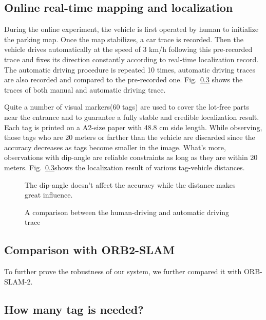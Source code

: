 \documentclass[journal]{IEEEtran}
\newcommand{\Reffig}[1]{Fig.~\ref{#1}}
\begin{document}
\subsection{Online real-time mapping and localization}
During the online experiment, the vehicle is first operated by human to initialize the parking map. 
Once the map stabilizes, a car trace is recorded.
Then the vehicle drives automatically at the speed of 3 km/h following this pre-recorded trace and fixes its direction constantly according to real-time localization record.
The automatic driving procedure is repeated 10 times, automatic driving traces are also recorded and compared to the pre-recorded one.
\Reffig{} shows the traces of both manual and automatic driving trace.

Quite a number of visual markers(60 tags) are used to cover the lot-free parts near the entrance and to guarantee a fully stable and credible localization result.
Each tag is printed on a A2-size paper with 48.8 cm side length.
While observing, those tags who are 20 meters or farther than the vehicle are discarded since the accuracy decreases as tags become smaller in the image.
What's more, observations with dip-angle are reliable constraints as long as they are within 20 meters.
\Reffig{}shows the localization result of various tag-vehicle distances.

\begin{figure}[htbp]
\centering
\caption{
The dip-angle doesn't affect the accuracy while the distance makes great influence.%
}\label{fig:10}
\end{figure}

\begin{figure}[htbp]
\centering
\caption{
A comparison between the human-driving and automatic driving trace%
}\label{fig:11}
\end{figure}

\subsection{Comparison with ORB2-SLAM}
To further prove the robustness of our system, we further compared it with ORB-SLAM-2.



\subsection{How many tag is needed?}
\end{document}
